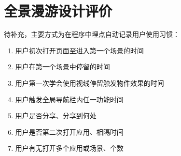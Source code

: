 \chapter{全景漫游设计评价}

待补充，主要方式为在程序中埋点自动记录用户使用习惯：
\begin{enumerate}
	\item 用户初次打开页面至进入第一个场景的时间
	\item 用户在第一个场景中停留的时间
	\item 用户第一次学会使用视线停留触发物件效果的时间
	\item 用户触发全局导航栏内任一功能时间
	\item 用户是否分享、分享到何处
    \item 用户是否第二次打开应用、相隔时间
    \item 用户有无打开多个应用或场景、个数
\end{enumerate}
